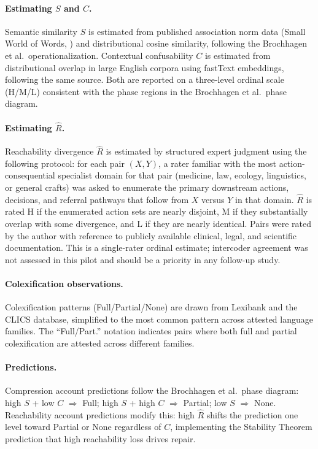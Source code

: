 \documentclass[12pt]{article}
\theoremstyle{rthm}
\theoremstyle{rdef}
\theoremstyle{remark}
\begin{document}
\paragraph{Estimating $S$ and $C$.}
Semantic similarity $S$ is estimated from published association norm data
(Small World of Words, \cite{brochhagen2026}) and distributional cosine
similarity, following the Brochhagen et al.\ operationalization. Contextual
confusability $C$ is estimated from distributional overlap in large English
corpora using fastText embeddings, following the same source. Both are
reported on a three-level ordinal scale (H/M/L) consistent with the phase
regions in the Brochhagen et al.\ phase diagram.

\paragraph{Estimating $\widehat{R}$.}
Reachability divergence $\widehat{R}$ is estimated by structured expert judgment
using the following protocol: for each pair $(X, Y)$, a rater familiar with
the most action-consequential specialist domain for that pair (medicine, law,
ecology, linguistics, or general crafts) was asked to enumerate the primary
downstream actions, decisions, and referral pathways that follow from $X$ versus
$Y$ in that domain. $\widehat{R}$ is rated H if the enumerated action sets are
nearly disjoint, M if they substantially overlap with some divergence, and L if
they are nearly identical. Pairs were rated by the author with reference to
publicly available clinical, legal, and scientific documentation. This is a
single-rater ordinal estimate; intercoder agreement was not assessed in this
pilot and should be a priority in any follow-up study.

\paragraph{Colexification observations.}
Colexification patterns (Full/Partial/None) are drawn from Lexibank
\cite{list2022} and the CLICS database, simplified to the most common pattern
across attested language families. The ``Full/Part.'' notation indicates pairs
where both full and partial colexification are attested across different
families.

\paragraph{Predictions.}
Compression account predictions follow the Brochhagen et al.\ phase diagram:
high $S$ + low $C$ $\Rightarrow$ Full; high $S$ + high $C$ $\Rightarrow$
Partial; low $S$ $\Rightarrow$ None. Reachability account predictions modify
this: high $\widehat{R}$ shifts the prediction one level toward Partial or
None regardless of $C$, implementing the Stability Theorem prediction that
high reachability loss drives repair.
\end{document}
